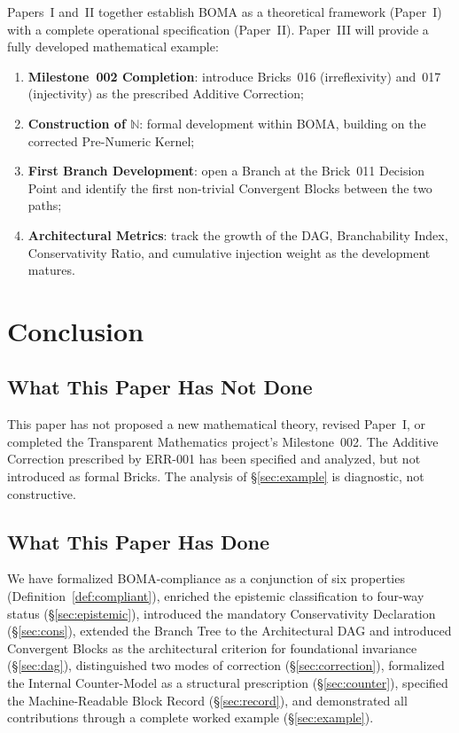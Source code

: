 \documentclass[12pt, a4paper]{article}
\theoremstyle{plain}
\theoremstyle{definition}
\theoremstyle{remark}
\newcommand{\BOMA}{\textsf{BOMA}}
\begin{document}
Papers~I and~II together establish \BOMA{} as a theoretical framework
(Paper~I) with a complete operational specification (Paper~II).
Paper~III will provide a fully developed mathematical example:

\begin{enumerate}
  \item \textbf{Milestone~002 Completion}: introduce Bricks~016
        (irreflexivity) and~017 (injectivity) as the prescribed
        Additive Correction;
  \item \textbf{Construction of $\mathbb{N}$}: formal development
        within \BOMA{}, building on the corrected Pre-Numeric Kernel;
  \item \textbf{First Branch Development}: open a Branch at the
        Brick~011 Decision Point and identify the first non-trivial
        Convergent Blocks between the two paths;
  \item \textbf{Architectural Metrics}: track the growth of the DAG,
        Branchability Index, Conservativity Ratio, and cumulative
        injection weight as the development matures.
\end{enumerate}

\section{Conclusion}
\label{sec:conclusion}

\subsection{What This Paper Has Not Done}
\label{subsec:conc-not}

This paper has not proposed a new mathematical theory, revised
Paper~I, or completed the Transparent Mathematics project's
Milestone~002. The Additive Correction prescribed by ERR-001 has been
specified and analyzed, but not introduced as formal Bricks. The
analysis of \S\ref{sec:example} is diagnostic, not constructive.

\subsection{What This Paper Has Done}
\label{subsec:conc-done}

We have formalized \BOMA{}-compliance as a conjunction of six
properties (Definition~\ref{def:compliant}), enriched the epistemic
classification to four-way status (\S\ref{sec:epistemic}), introduced
the mandatory Conservativity Declaration (\S\ref{sec:cons}), extended
the Branch Tree to the Architectural DAG and introduced Convergent
Blocks as the architectural criterion for foundational invariance
(\S\ref{sec:dag}), distinguished two modes of correction
(\S\ref{sec:correction}), formalized the Internal Counter-Model as a
structural prescription (\S\ref{sec:counter}), specified the
Machine-Readable Block Record (\S\ref{sec:record}), and demonstrated
all contributions through a complete worked example
(\S\ref{sec:example}).
\end{document}
